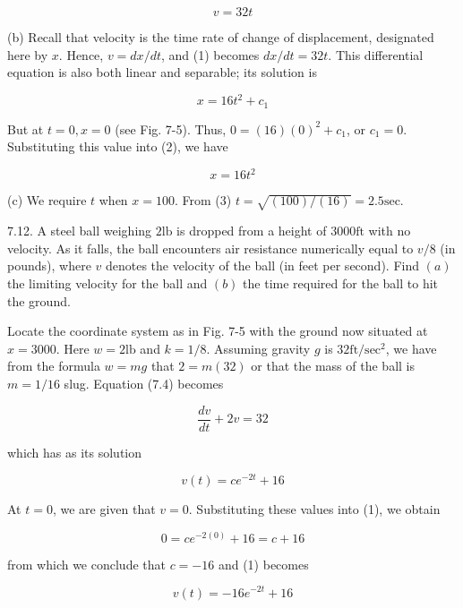 \documentclass[10pt]{article}
\begin{document}
\begin{equation*}
v=32 t \tag{1}
\end{equation*}


(b) Recall that velocity is the time rate of change of displacement, designated here by $x$. Hence, $v=d x / d t$, and (1) becomes $d x / d t=32 t$. This differential equation is also both linear and separable; its solution is


\begin{equation*}
x=16 t^{2}+c_{1} \tag{2}
\end{equation*}


But at $t=0, x=0$ (see Fig. 7-5). Thus, $0=(16)(0)^{2}+c_{1}$, or $c_{1}=0$. Substituting this value into (2), we have


\begin{equation*}
x=16 t^{2} \tag{3}
\end{equation*}


(c) We require $t$ when $x=100$. From (3) $t=\sqrt{(100) /(16)}=2.5 \mathrm{sec}$.

7.12. A steel ball weighing $2 \mathrm{lb}$ is dropped from a height of $3000 \mathrm{ft}$ with no velocity. As it falls, the ball encounters air resistance numerically equal to $v / 8$ (in pounds), where $v$ denotes the velocity of the ball (in feet per second). Find $(a)$ the limiting velocity for the ball and $(b)$ the time required for the ball to hit the ground.

Locate the coordinate system as in Fig. 7-5 with the ground now situated at $x=3000$. Here $w=2 \mathrm{lb}$ and $k=1 / 8$. Assuming gravity $g$ is $32 \mathrm{ft} / \mathrm{sec}^{2}$, we have from the formula $w=m g$ that $2=m(32)$ or that the mass of the ball is $m=1 / 16$ slug. Equation (7.4) becomes

$$
\frac{d v}{d t}+2 v=32
$$

which has as its solution


\begin{equation*}
v(t)=c e^{-2 t}+16 \tag{1}
\end{equation*}


At $t=0$, we are given that $v=0$. Substituting these values into (1), we obtain

$$
0=c e^{-2(0)}+16=c+16
$$

from which we conclude that $c=-16$ and (1) becomes


\begin{equation*}
v(t)=-16 e^{-2 t}+16 \tag{2}
\end{equation*}
\end{document}
